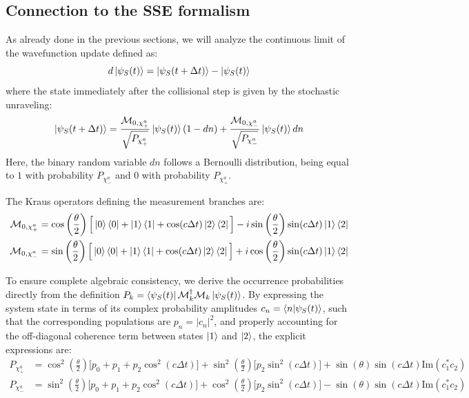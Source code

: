 \documentclass[a4paper,12pt]{article}
\begin{document}
\newpage 

\subsection{Connection to the SSE formalism}
\label{sub:connection_to_SSE_Photoemission}

As already done in the previous sections, we will analyze the continuous limit of the wavefunction update defined as: 
\begin{equation}
	d\ket{\psi_{S}(t)} = \ket{\psi_{S}(t + \Delta t)} - \ket{\psi_{S}(t)}
\end{equation}
where the state immediately after the collisional step is given by the stochastic unraveling:
\begin{equation}
	\ket{\psi_{S}(t + \Delta t)} = \frac{\mathcal{M}_{0, \chi_{+}^{a}}}{\sqrt{P_{\chi_{+}^{a}}}} \ket{\psi_{S}(t)} (1 - dn) + \frac{\mathcal{M}_{0, \chi_{-}^{a}}}{\sqrt{P_{\chi_{-}^{a}}}} \ket{\psi_{S}(t)} dn
	\label{eq:new_stochastic_update}
\end{equation}
Here, the binary random variable $dn$ follows a Bernoulli distribution, being equal to $1$ with probability $P_{\chi_{-}^{a}}$ and $0$ with probability $P_{\chi_{+}^{a}}$.

The Kraus operators defining the measurement branches are:
\begin{align}
	\mathcal{M}_{0, \chi_{+}^{a}} &= \cos\left(\frac{\theta}{2}\right) \Big[ \ket{0}\bra{0} + \ket{1}\bra{1} + \cos(c \Delta t) \ket{2}\bra{2} \Big] - i \sin\left(\frac{\theta}{2}\right) \sin(c \Delta t) \ket{1}\bra{2} \label{eq:M0_chi_plus} \\
	\mathcal{M}_{0, \chi_{-}^{a}} &= \sin\left(\frac{\theta}{2}\right) \Big[ \ket{0}\bra{0} + \ket{1}\bra{1} + \cos(c \Delta t) \ket{2}\bra{2} \Big] + i \cos\left(\frac{\theta}{2}\right) \sin(c \Delta t) \ket{1}\bra{2} \label{eq:M0_chi_minus}
\end{align}

To ensure complete algebraic consistency, we derive the occurrence probabilities directly from the definition $P_k = \bra{\psi_S(t)} \mathcal{M}_k^\dagger \mathcal{M}_k \ket{\psi_S(t)}$. By expressing the system state in terms of its complex probability amplitudes $c_n = \braket{n|\psi_S(t)}$, such that the corresponding populations are $p_n = |c_n|^2$, and properly accounting for the off-diagonal coherence term between states $\ket{1}$ and $\ket{2}$, the explicit expressions are:
\begin{align}
	P_{\chi_{+}^{a}} &= \cos^2 \left(\frac{\theta}{2}\right) \Big[ p_{0} + p_{1} + p_{2} \cos^2 \left( c \Delta t \right) \Big] + \sin^2 \left(\frac{\theta}{2}\right) \Big[ p_{2} \sin^2 \left( c \Delta t \right) \Big] + \sin(\theta)\sin \left( c \Delta t \right) \text{Im}(c_1^* c_2) \\
	P_{\chi_{-}^{a}} &= \sin^2 \left(\frac{\theta}{2}\right) \Big[ p_{0} + p_{1} + p_{2} \cos^2 \left( c \Delta t \right) \Big] + \cos^2 \left(\frac{\theta}{2}\right) \Big[ p_{2} \sin^2 \left( c \Delta t \right) \Big] - \sin(\theta)\sin \left( c \Delta t \right) \text{Im}(c_1^* c_2)
\end{align}
\end{document}
